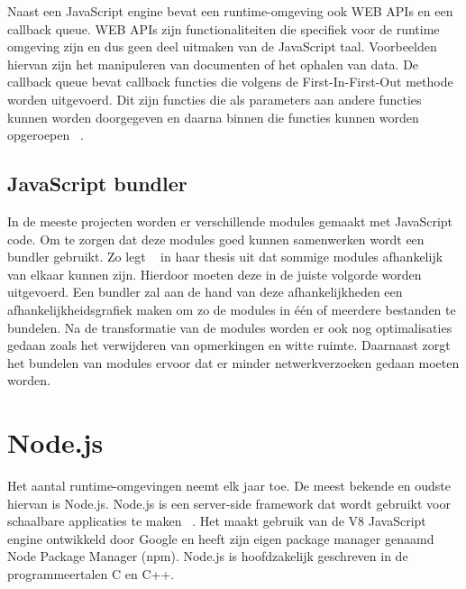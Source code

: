 Naast een JavaScript engine bevat een runtime-omgeving ook WEB APIs en een callback queue. 
WEB APIs zijn functionaliteiten die specifiek voor de runtime omgeving zijn en dus geen deel uitmaken van de JavaScript taal.
Voorbeelden hiervan zijn het manipuleren van documenten of het ophalen van data.
De callback queue bevat callback functies die volgens de First-In-First-Out methode worden uitgevoerd.
Dit zijn functies die als parameters aan andere functies kunnen worden doorgegeven en 
daarna binnen die functies kunnen worden opgeroepen ~\autocite{Eygi2020}.

\subsection{JavaScript bundler}
In de meeste projecten worden er verschillende modules gemaakt met JavaScript code. 
Om te zorgen dat deze modules goed kunnen samenwerken wordt een bundler gebruikt. 
Zo legt ~\textcite{Laurila2020} in haar thesis uit dat sommige modules afhankelijk van elkaar kunnen zijn. 
Hierdoor moeten deze in de juiste volgorde worden uitgevoerd. Een bundler zal aan de hand van deze afhankelijkheden 
een afhankelijkheidsgrafiek maken om zo de modules in één of meerdere bestanden te bundelen. 
Na de transformatie van de modules worden er ook nog optimalisaties gedaan zoals het verwijderen van opmerkingen en witte ruimte.
Daarnaast zorgt het bundelen van modules ervoor dat er minder netwerkverzoeken gedaan moeten worden.

\section{Node.js}
Het aantal runtime-omgevingen neemt elk jaar toe. De meest bekende en oudste hiervan is Node.js.
Node.js is een server-side framework dat wordt gebruikt voor schaalbare applicaties te maken ~\autocite{Gackenheimer2013}.
Het maakt gebruik van de V8 JavaScript engine ontwikkeld door Google en heeft zijn eigen package manager genaamd Node Package Manager (npm).
Node.js is hoofdzakelijk geschreven in de programmeertalen C en C++.

